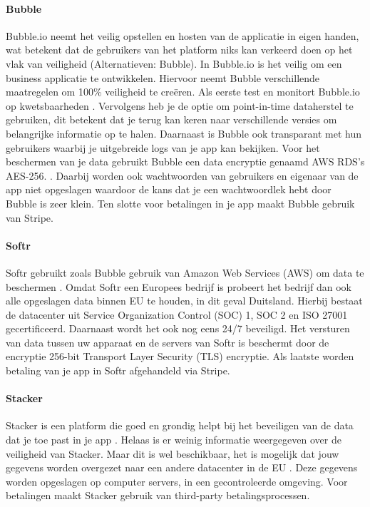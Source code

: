 \paragraph{Bubble}
Bubble.io neemt het veilig opstellen en hosten van de applicatie in eigen handen, wat betekent dat de gebruikers van het platform niks kan verkeerd doen op het vlak van veiligheid (Alternatieven: Bubble).
In Bubble.io is het veilig om een business applicatie te ontwikkelen. Hiervoor neemt Bubble verschillende maatregelen om 100\% veiligheid te creëren. 
Als eerste test en monitort Bubble.io op kwetsbaarheden \autocite{Agency2023}. Vervolgens heb je de optie om point-in-time dataherstel te gebruiken, dit betekent dat je terug kan keren naar verschillende versies om belangrijke informatie op te halen. Daarnaast is Bubble ook transparant met hun gebruikers waarbij je uitgebreide logs van je app kan bekijken. Voor het beschermen van je data gebruikt Bubble een data encryptie genaamd AWS RDS’s AES-256. . Daarbij worden ook wachtwoorden van gebruikers en eigenaar van de app niet opgeslagen waardoor de kans dat je een wachtwoordlek hebt door Bubble is zeer klein. Ten slotte voor betalingen in je app maakt Bubble gebruik van Stripe.
\paragraph{Softr}
Softr gebruikt zoals Bubble gebruik van Amazon Web Services (AWS) om data te beschermen \autocite{Softr}. Omdat Softr een Europees bedrijf is probeert het bedrijf dan ook alle opgeslagen data binnen EU te houden, in dit geval Duitsland. Hierbij bestaat de datacenter uit Service Organization Control (SOC) 1, SOC 2 en ISO 27001 gecertificeerd. Daarnaast wordt het ook nog eens 24/7 beveiligd. Het versturen van data tussen uw apparaat en de servers van 
Softr is beschermt door de encryptie 256-bit Transport Layer Security (TLS) encryptie. Als laatste worden betaling van je app in Softr afgehandeld via Stripe.
\paragraph{Stacker}
Stacker is een platform die goed en grondig helpt bij het beveiligen van de data dat je toe past in je app \autocite{JDN2023}.
 Helaas is er weinig informatie weergegeven over de veiligheid van Stacker. Maar dit is wel beschikbaar, 
 het is mogelijk dat jouw gegevens worden overgezet naar een andere datacenter in de EU \autocite{Stacker2023}. 
 Deze gegevens worden opgeslagen op computer servers, in een gecontroleerde omgeving. Voor betalingen maakt Stacker gebruik van third-party betalingsprocessen.
